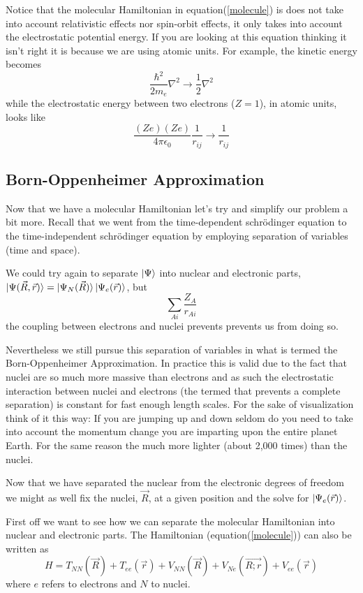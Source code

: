 \documentclass[a4paper]{article}
\begin{document}
Notice that the molecular Hamiltonian in equation(\ref{molecule}) is does not take into account relativistic effects nor spin-orbit effects, it only takes into account the electrostatic potential energy.
If you are looking at this equation thinking it isn't right it is because we are using atomic units.
For example, the kinetic energy becomes
$$
\frac{\hbar^2}{2m_e}\nabla^2 \longrightarrow \frac{1}{2}\nabla^2
$$
while the electrostatic energy between two electrons ($Z=1$), in atomic units, looks like
$$
\frac{(Ze)(Ze)}{4\pi\epsilon_0} \frac{1}{r_{ij}} \longrightarrow \frac{1}{r_{ij}}
$$


\subsection{Born-Oppenheimer Approximation}
Now that we have a molecular Hamiltonian let's try and simplify our problem a bit more.
Recall that we went from the time-dependent schr\"odinger equation to the time-independent schr\"odinger equation by employing separation of variables (time and space).

We could try again to separate $\ket{\Psi}$ into nuclear and electronic parts, $\ket{\Psi(\vec{R}, \vec{r})} = \ket{\Psi_N(\vec{R})} \ket{\Psi_e (\vec{r})}$, but
$$
\sum_{Ai} \frac{Z_A}{r_{Ai}}
$$
the coupling between electrons and nuclei prevents prevents us from doing so.

Nevertheless we still pursue this separation of variables in what is termed the Born-Oppenheimer Approximation.
In practice this is valid due to the fact that nuclei are so much more massive than electrons and as such the electrostatic interaction between nuclei and electrons (the termed that prevents a complete separation) is constant for fast enough length scales.
For the sake of visualization think of it this way: If you are jumping up and down seldom do you need to take into account the momentum change you are imparting upon the entire planet Earth. For the same reason the much more lighter (about 2,000 times) than the nuclei.

Now that we have separated the nuclear from the electronic degrees of freedom we might as well fix the nuclei, $\vec{R}$, at a given position and the solve for $\ket{\Psi_e (\vec{r})}$.

First off we want to see how we can separate the molecular Hamiltonian into nuclear and electronic parts.
The Hamiltonian (equation(\ref{molecule})) can also be written as
$$
H = T_{NN} (\vec{R}) + T_{ee} (\vec{r}) + V_{NN} (\vec{R}) + V_{Ne} (\vec{R;r}) + V_{ee} (\vec{r})
$$
where $e$ refers to electrons and $N$ to nuclei.
\end{document}
